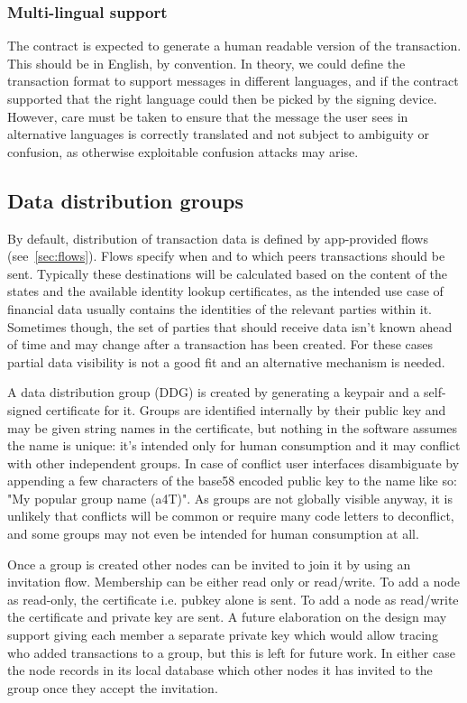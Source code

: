 \documentclass{article}
\begin{document}
\subsubsection{Multi-lingual support}

The contract is expected to generate a human readable version of the transaction. This should be in English, by
convention. In theory, we could define the transaction format to support messages in different languages, and if
the contract supported that the right language could then be picked by the signing device. However, care must be
taken to ensure that the message the user sees in alternative languages is correctly translated and not subject to
ambiguity or confusion, as otherwise exploitable confusion attacks may arise.


\subsection{Data distribution groups}

By default, distribution of transaction data is defined by app-provided flows (see~\cref{sec:flows}). Flows specify
when and to which peers transactions should be sent. Typically these destinations will be calculated based on the
content of the states and the available identity lookup certificates, as the intended use case of financial data
usually contains the identities of the relevant parties within it. Sometimes though, the set of parties that should
receive data isn't known ahead of time and may change after a transaction has been created. For these cases partial
data visibility is not a good fit and an alternative mechanism is needed.

A data distribution group (DDG) is created by generating a keypair and a self-signed certificate for it. Groups are
identified internally by their public key and may be given string names in the certificate, but nothing in the
software assumes the name is unique: it's intended only for human consumption and it may conflict with other
independent groups. In case of conflict user interfaces disambiguate by appending a few characters of the base58
encoded public key to the name like so:  "My popular group name (a4T)". As groups are not globally visible anyway,
it is unlikely that conflicts will be common or require many code letters to deconflict, and some groups may not
even be intended for human consumption at all.

Once a group is created other nodes can be invited to join it by using an invitation flow. Membership can be either
read only or read/write. To add a node as read-only, the certificate i.e. pubkey alone is sent. To add a node as
read/write the certificate and private key are sent. A future elaboration on the design may support giving each
member a separate private key which would allow tracing who added transactions to a group, but this is left for
future work. In either case the node records in its local database which other nodes it has invited to the group
once they accept the invitation.
\end{document}

